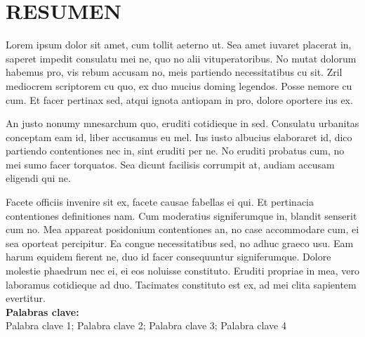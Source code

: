 \chapter*{\center \Large RESUMEN}
Lorem ipsum dolor sit amet, cum tollit aeterno ut. Sea amet iuvaret placerat in, saperet impedit consulatu mei ne, quo no alii vituperatoribus. No mutat dolorum habemus pro, vis rebum accusam no, meis partiendo necessitatibus cu sit. Zril mediocrem scriptorem cu quo, ex duo mucius doming legendos. Posse nemore cu cum. Et facer pertinax sed, atqui ignota antiopam in pro, dolore oportere ius ex.

An justo nonumy mnesarchum quo, eruditi cotidieque in sed. Consulatu urbanitas conceptam eam id, liber accusamus eu mel. Ius iusto albucius elaboraret id, dico partiendo contentiones nec in, sint eruditi per ne. No eruditi probatus cum, no mei sumo facer torquatos. Sea dicunt facilisis corrumpit at, audiam accusam eligendi qui ne.

Facete officiis invenire sit ex, facete causae fabellas ei qui. Et pertinacia contentiones definitiones nam. Cum moderatius signiferumque in, blandit senserit cum no. Mea appareat posidonium contentiones an, no case accommodare cum, ei sea oporteat percipitur. 
Ea congue necessitatibus sed, no adhuc graeco usu. Eam harum equidem fierent ne, duo id facer consequuntur signiferumque. Dolore molestie phaedrum nec ei, ei eos noluisse constituto. Eruditi propriae in mea, vero laboramus cotidieque ad duo. Tacimates constituto est ex, ad mei clita sapientem evertitur. \\


\noindent \textbf{Palabras clave:}\\
\noindent Palabra clave 1; Palabra clave 2; Palabra clave 3; Palabra clave 4